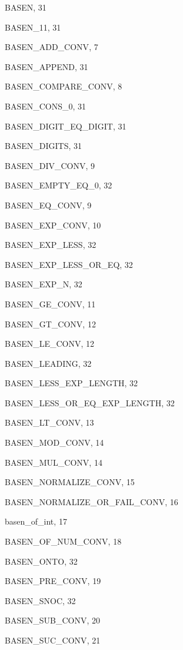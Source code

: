 \begin{theindex}

  \item {\ptt BASEN}, 31
  \item {\ptt BASEN\_11}, 31
  \item {\ptt BASEN\_ADD\_CONV}, 7
  \item {\ptt BASEN\_APPEND}, 31
  \item {\ptt BASEN\_COMPARE\_CONV}, 8
  \item {\ptt BASEN\_CONS\_0}, 31
  \item {\ptt BASEN\_DIGIT\_EQ\_DIGIT}, 31
  \item {\ptt BASEN\_DIGITS}, 31
  \item {\ptt BASEN\_DIV\_CONV}, 9
  \item {\ptt BASEN\_EMPTY\_EQ\_0}, 32
  \item {\ptt BASEN\_EQ\_CONV}, 9
  \item {\ptt BASEN\_EXP\_CONV}, 10
  \item {\ptt BASEN\_EXP\_LESS}, 32
  \item {\ptt BASEN\_EXP\_LESS\_OR\_EQ}, 32
  \item {\ptt BASEN\_EXP\_N}, 32
  \item {\ptt BASEN\_GE\_CONV}, 11
  \item {\ptt BASEN\_GT\_CONV}, 12
  \item {\ptt BASEN\_LE\_CONV}, 12
  \item {\ptt BASEN\_LEADING}, 32
  \item {\ptt BASEN\_LESS\_EXP\_LENGTH}, 32
  \item {\ptt BASEN\_LESS\_OR\_EQ\_EXP\_LENGTH}, 32
  \item {\ptt BASEN\_LT\_CONV}, 13
  \item {\ptt BASEN\_MOD\_CONV}, 14
  \item {\ptt BASEN\_MUL\_CONV}, 14
  \item {\ptt BASEN\_NORMALIZE\_CONV}, 15
  \item {\ptt BASEN\_NORMALIZE\_OR\_FAIL\_CONV}, 16
  \item {\ptt basen\_of\_int}, 17
  \item {\ptt BASEN\_OF\_NUM\_CONV}, 18
  \item {\ptt BASEN\_ONTO}, 32
  \item {\ptt BASEN\_PRE\_CONV}, 19
  \item {\ptt BASEN\_SNOC}, 32
  \item {\ptt BASEN\_SUB\_CONV}, 20
  \item {\ptt BASEN\_SUC\_CONV}, 21

\end{theindex}
